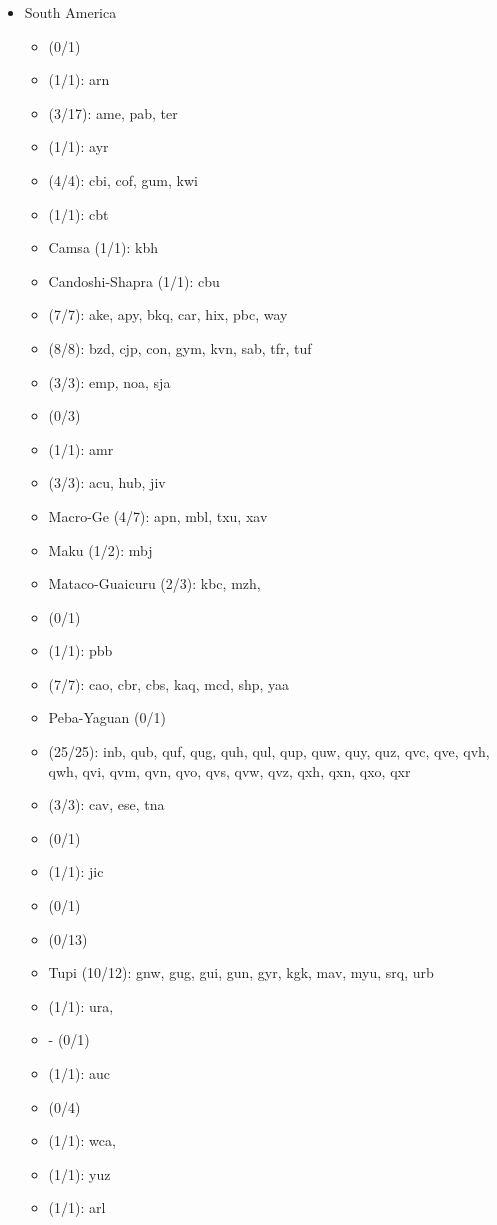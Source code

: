 \begin{itemize}[label={},leftmargin=0cm,labelindent=5pt,itemindent=0pt]
  \item South America
    \begin{itemize}[label={},leftmargin=!,labelindent=5pt,itemindent=-15pt]
  	\item {} (0/1)
  	\item {} (1/1): arn
  	\item {} (3/17): ame, pab, ter
  	\item {} (1/1): ayr
  	\item {} (4/4): cbi, cof, gum, kwi
  	\item {} (1/1): cbt
  	\item Camsa (1/1): kbh
  	\item Candoshi-Shapra (1/1): cbu
  	\item {} (7/7): ake, apy, bkq, car, hix, pbc, way
  	\item {} (8/8): bzd, cjp, con, gym, kvn, sab, tfr, tuf
  	\item {} (3/3): emp, noa, sja
  	\item {} (0/3)
  	\item {} (1/1): amr
  	\item {} (3/3): acu, hub, jiv
  	\item Macro-Ge (4/7): apn, mbl, txu, xav
  	\item Maku (1/2): mbj
  	\item Mataco-Guaicuru (2/3): kbc, mzh,
  	\item {} (0/1)
  	\item {} (1/1): pbb
  	\item {} (7/7): cao, cbr, cbs, kaq, mcd, shp, yaa
  	\item Peba-Yaguan (0/1)
  	\item {} (25/25): inb, qub, quf, qug, quh, qul, qup, quw, quy, quz, qvc, qve, qvh, qwh, qvi, qvm, qvn, qvo, qvs, qvw, qvz, qxh, qxn, qxo, qxr
  	\item {} (3/3): cav, ese, tna
  	\item {} (0/1)
  	\item {} (1/1): jic
  	\item {} (0/1)
  	\item {} (0/13)
  	\item Tupi (10/12): gnw, gug, gui, gun, gyr, kgk, mav, myu, srq, urb
  	\item {} (1/1): ura,
  	\item {}- (0/1)
  	\item {} (1/1): auc
  	\item {} (0/4)
  	\item {} (1/1): wca,
  	\item {} (1/1): yuz
  	\item {} (1/1): arl
    \end{itemize}

\end{itemize}

